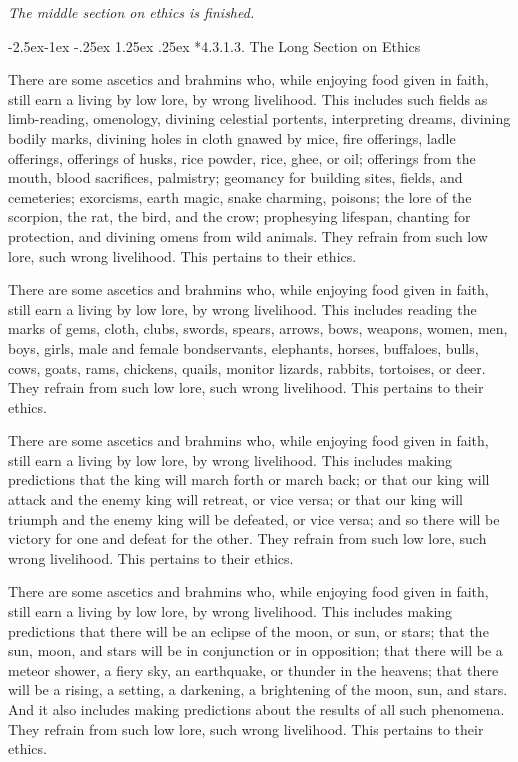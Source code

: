 \documentclass[12pt,openany]{book}%
\makeatletter
\renewcommand\paragraph{\@startsection{paragraph}{4}{\z@}%
            {-2.5ex\@plus -1ex \@minus -.25ex}%
            {1.25ex \@plus .25ex}%
            {\noindent\normalfont\itshape\small}}
\newcommand*{\scendsection}[1]{\begin{Center}\begin{small}\textit{#1}\end{small}\end{Center}\addvspace{1em}}
\makeatother
\begin{document}
\scendsection{The middle section on ethics is finished. }

\paragraph*{4.3.1.3. The Long Section on Ethics }

There are some ascetics and brahmins who, while enjoying food given in faith, still earn a living by low lore, by wrong livelihood. This includes such fields as limb-reading, omenology, divining celestial portents, interpreting dreams, divining bodily marks, divining holes in cloth gnawed by mice, fire offerings, ladle offerings, offerings of husks, rice powder, rice, ghee, or oil; offerings from the mouth, blood sacrifices, palmistry; geomancy for building sites, fields, and cemeteries; exorcisms, earth magic, snake charming, poisons; the lore of the scorpion, the rat, the bird, and the crow; prophesying lifespan, chanting for protection, and divining omens from wild animals. They refrain from such low lore, such wrong livelihood. This pertains to their ethics. 

There are some ascetics and brahmins who, while enjoying food given in faith, still earn a living by low lore, by wrong livelihood. This includes reading the marks of gems, cloth, clubs, swords, spears, arrows, bows, weapons, women, men, boys, girls, male and female bondservants, elephants, horses, buffaloes, bulls, cows, goats, rams, chickens, quails, monitor lizards, rabbits, tortoises, or deer. They refrain from such low lore, such wrong livelihood. This pertains to their ethics. 

There are some ascetics and brahmins who, while enjoying food given in faith, still earn a living by low lore, by wrong livelihood. This includes making predictions that the king will march forth or march back; or that our king will attack and the enemy king will retreat, or vice versa; or that our king will triumph and the enemy king will be defeated, or vice versa; and so there will be victory for one and defeat for the other. They refrain from such low lore, such wrong livelihood. This pertains to their ethics. 

There are some ascetics and brahmins who, while enjoying food given in faith, still earn a living by low lore, by wrong livelihood. This includes making predictions that there will be an eclipse of the moon, or sun, or stars; that the sun, moon, and stars will be in conjunction or in opposition; that there will be a meteor shower, a fiery sky, an earthquake, or thunder in the heavens; that there will be a rising, a setting, a darkening, a brightening of the moon, sun, and stars. And it also includes making predictions about the results of all such phenomena. They refrain from such low lore, such wrong livelihood. This pertains to their ethics. 
\end{document}
